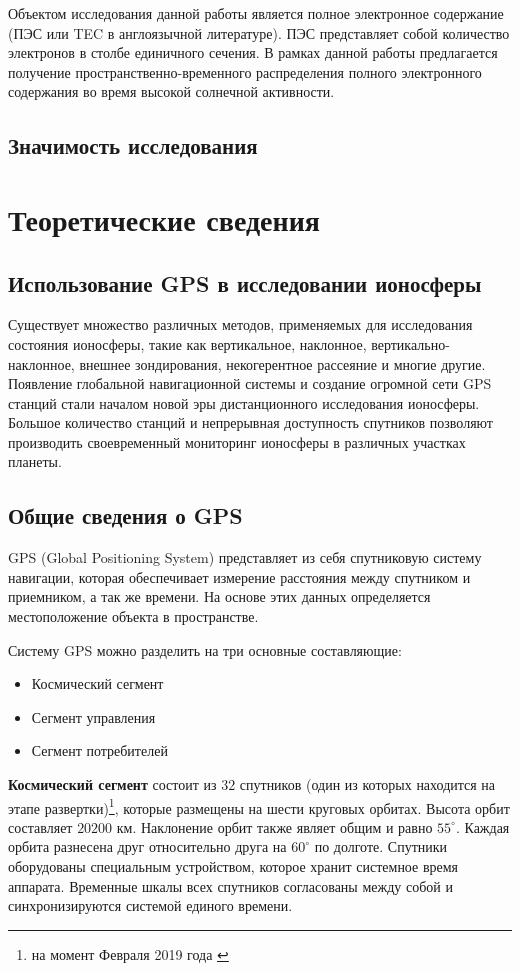 \documentclass[a4paper]{article}
\begin{document}
Объектом исследования данной работы является полное электронное содержание (ПЭС или TEC в англоязычной литературе). ПЭС представляет собой количество электронов в столбе единичного сечения. В рамках данной работы предлагается получение пространственно-временного распределения полного электронного содержания во время высокой солнечной активности.

\subsection*{Значимость исследования}


\newpage
\section{Теоретические сведения}
\subsection{Использование GPS в исследовании ионосферы}
Существует множество различных методов, применяемых для исследования состояния ионосферы, такие как вертикальное, наклонное, вертикально-наклонное, внешнее зондирования, некогерентное рассеяние и многие другие. Появление глобальной навигационной системы и создание огромной сети GPS станций стали началом новой эры дистанционного исследования ионосферы. Большое количество станций и непрерывная доступность спутников позволяют производить своевременный мониторинг ионосферы в различных участках планеты. 

\subsection{Общие сведения о GPS}
GPS (Global Positioning System) представляет из себя спутниковую систему навигации, которая обеспечивает измерение расстояния между спутником и приемником, а так же времени. На основе этих данных определяется местоположение объекта в пространстве.

Систему GPS можно разделить на три основные составляющие:
\begin{itemize}
\item Космический сегмент
\item Сегмент управления
\item Сегмент потребителей
\end{itemize}

\textbf{Космический сегмент} состоит из $32$ спутников (один из которых находится на этапе развертки)\footnote{на момент Февраля 2019 года \cite{gpsgov}}, которые размещены на шести круговых орбитах. Высота орбит составляет $20200$ км. Наклонение орбит также являет общим и равно $55^{\circ}$. Каждая орбита разнесена друг относительно друга на $60^{\circ}$ по долготе. Спутники оборудованы специальным устройством, которое хранит системное время аппарата. Временные шкалы всех спутников согласованы между собой и синхронизируются системой единого времени.
\end{document}

